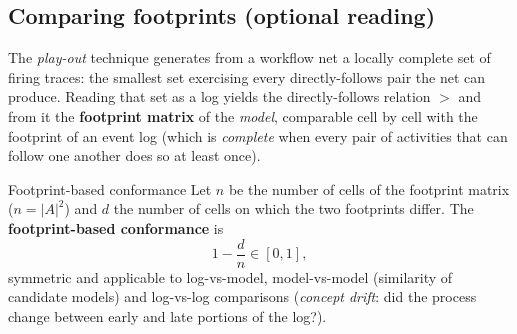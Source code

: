 \subsection{Comparing footprints (optional reading)}

The \emph{play-out} technique generates from a workflow net a locally complete set of firing traces: the smallest set exercising every directly-follows pair the net can produce. Reading that set as a log yields the directly-follows relation $>$ and from it the \textbf{footprint matrix} of the \emph{model}, comparable cell by cell with the footprint of an event log (which is \emph{complete} when every pair of activities that can follow one another does so at least once).
\begin{definitionbox}{Footprint-based conformance}
Let $n$ be the number of cells of the footprint matrix ($n = |A|^2$) and $d$ the number of cells on which the two footprints differ. The \textbf{footprint-based conformance} is
$$1 - \frac{d}{n} \in [0,1],$$
symmetric and applicable to log-vs-model, model-vs-model (similarity of candidate models) and log-vs-log comparisons (\emph{concept drift}: did the process change between early and late portions of the log?).
\end{definitionbox}

